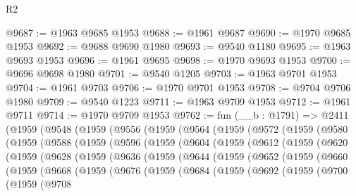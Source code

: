 \begin{lexlean}{R2}
\begin{coremodule}
@9687 := @1963 @9685 @1953
@9688 := @1961 @9687
@9690 := @1970 @9685 @1953
@9692 := @9688 @9690 @1980
@9693 := @9540 @1180
@9695 := @1963 @9693 @1953
@9696 := @1961 @9695
@9698 := @1970 @9693 @1953
@9700 := @9696 @9698 @1980
@9701 := @9540 @1205
@9703 := @1963 @9701 @1953
@9704 := @1961 @9703
@9706 := @1970 @9701 @1953
@9708 := @9704 @9706 @1980
@9709 := @9540 @1223
@9711 := @1963 @9709 @1953
@9712 := @1961 @9711
@9714 := @1970 @9709 @1953
@9762 := fun (__b : @1791) =>
  @2411
    (@1959
      (@9548
        (@1959
          (@9556
            (@1959
              (@9564
                (@1959
                  (@9572
                    (@1959
                      (@9580
                        (@1959
                          (@9588
                            (@1959
                              (@9596
                                (@1959
                                  (@9604
                                    (@1959
                                      (@9612
                                        (@1959
                                          (@9620
                                            (@1959
                                              (@9628
                                                (@1959
                                                  (@9636
                                                    (@1959
                                                      (@9644
                                                        (@1959
                                                          (@9652
                                                            (@1959
                                                              (@9660
                                                                (@1959
                                                                  (@9668
                                                                    (@1959
                                                                      (@9676
                                                                        (@1959
                                                                          (@9684
                                                                            (@1959
                                                                              (@9692
                                                                                (@1959
                                                                                  (@9700
                                                                                    (@1959
                                                                                      (@9708

\end{coremodule}
\end{lexlean}
